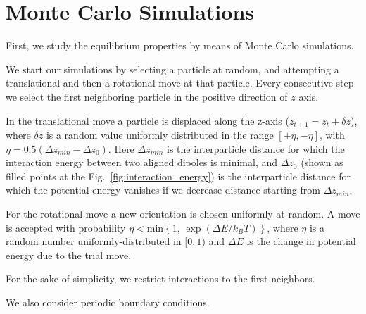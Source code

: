 \section{Monte Carlo Simulations}

First, we study the equilibrium properties by means of Monte Carlo simulations.

We start our simulations by selecting a particle at random, and attempting a translational and then a rotational move at that particle. Every consecutive step we select the first neighboring particle in the positive direction of $z$ axis.

In the translational move a particle is displaced along the z-axis ($z_{t+1} = z_t + \delta z$), where $\delta z$ is a random value uniformly distributed in the range $[+\eta, -\eta]$, with $\eta = 0.5 (\Delta z_{min} - \Delta z_0)$. Here $\Delta z_{min}$ is the interparticle distance for which the interaction energy between two aligned dipoles is minimal, and $\Delta z_0$ (shown as filled points at the Fig.~\ref{fig:interaction_energy}) is the interparticle distance for which the potential energy vanishes if we decrease distance starting from $\Delta z_{min}$.

For the rotational move a new orientation is chosen uniformly at random. A move is accepted with probability $\eta < \mathrm{min} \left\{1, \, \exp(\Delta E / k_BT) \right\}$, where $\eta$ is a random number uniformly-distributed in $[0, 1)$ and $\Delta E$ is the change in potential energy due to the trial move.

For the sake of simplicity, we restrict interactions to the first-neighbors.

We also consider periodic boundary conditions.

